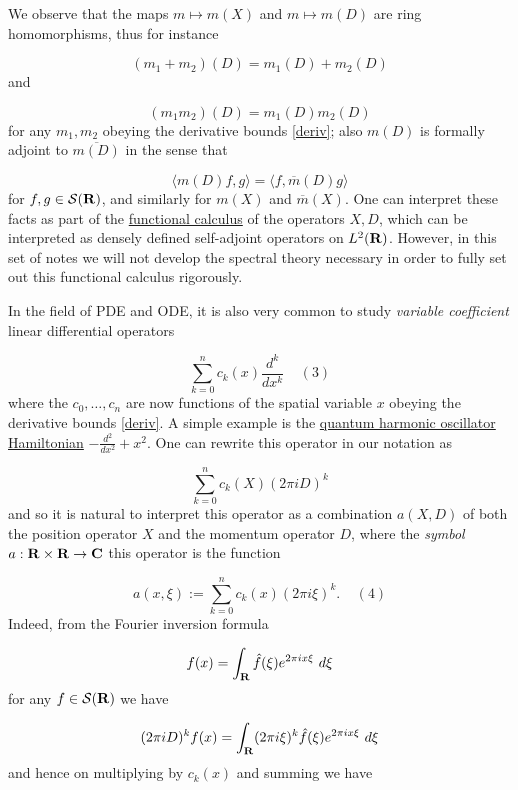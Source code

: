 \documentclass[11pt]{article}
\theoremstyle{definition}
\theoremstyle{remark}
\begin{document}
We observe that the maps \({m \mapsto m(X)}\) and \({m \mapsto m(D)}\) are ring homomorphisms, thus for instance 

\[\displaystyle  (m_1 + m_2)(D) = m_1(D) + m_2(D)\]
 and 

\[\displaystyle  (m_1 m_2)(D) = m_1(D) m_2(D)\]
 for any \({m_1,m_2}\) obeying the derivative bounds \eqref{deriv}; also \({m(D)}\) is formally adjoint to \({\overline{m(D)}}\) in the sense that 

\[\displaystyle  \langle m(D) f, g \rangle = \langle f, \overline{m}(D) g \rangle\]
 for \({f,g \in {\mathcal S}({\bf R})}\), and similarly for \({m(X)}\) and \({\overline{m}(X)}\). One can interpret these facts as part of the \href{https://en.wikipedia.org/wiki/Functional_calculus}{functional calculus} of the operators \({X,D}\), which can be interpreted as densely defined self-adjoint operators on \({L^2({\bf R})}\). However, in this set of notes we will not develop the spectral theory necessary in order to fully set out this functional calculus rigorously.


In the field of PDE and ODE, it is also very common to study \emph{variable coefficient} linear differential operators \label{ckk}

\[\displaystyle  \sum_{k=0}^n c_k(x) \frac{d^k}{dx^k} \ \ \ \ \ (3)\]
 where the \({c_0,\dots,c_n}\) are now functions of the spatial variable \({x}\) obeying the derivative bounds \eqref{deriv}. A simple example is the \href{https://en.wikipedia.org/wiki/Quantum_harmonic_oscillator}{quantum harmonic oscillator Hamiltonian} \({-\frac{d^2}{dx^2} + x^2}\). One can rewrite this operator in our notation as 

\[\displaystyle  \sum_{k=0}^n c_k(X) (2\pi i D)^k\]
 and so it is natural to interpret this operator as a combination \({a(X,D)}\) of both the position operator \({X}\) and the momentum operator \({D}\), where the \emph{symbol} \({a: {\bf R} \times {\bf R} \rightarrow {\bf C}}\) this operator is the function \label{akk}

\[\displaystyle  a(x,\xi) := \sum_{k=0}^n c_k(x) (2\pi i \xi)^k. \ \ \ \ \ (4)\]
 Indeed, from the Fourier inversion formula 

\[\displaystyle  f(x) = \int_{\bf R} \hat f(\xi) e^{2\pi i x \xi}\ d\xi\]
 for any \({f \in {\mathcal S}({\bf R})}\) we have 

\[\displaystyle  (2\pi i D)^k f(x) = \int_{\bf R} (2\pi i \xi)^k \hat f(\xi) e^{2\pi i x \xi}\ d\xi\]
 and hence on multiplying by \({c_k(x)}\) and summing we have 
\end{document}

